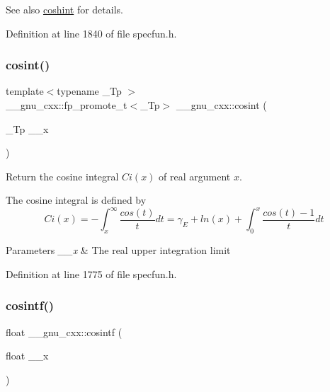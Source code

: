 \begin{DoxySeeAlso}{See also}
\hyperlink{group__gnu__math__spec__func_ga2411d513d418180285ace6650c7b7e31}{coshint} for details. 
\end{DoxySeeAlso}


Definition at line 1840 of file specfun.\+h.

\mbox{\label{group__gnu__math__spec__func_gafd398869cde057087e6b3428a1d13a93}} 
\subsubsection{\texorpdfstring{cosint()}{cosint()}}
{\footnotesize\ttfamily template$<$typename \+\_\+\+Tp $>$ \\
\+\_\+\+\_\+gnu\+\_\+cxx\+::fp\+\_\+promote\+\_\+t$<$\+\_\+\+Tp$>$ \+\_\+\+\_\+gnu\+\_\+cxx\+::cosint (\begin{DoxyParamCaption}\item[{\+\_\+\+Tp}]{\+\_\+\+\_\+x }\end{DoxyParamCaption})\hspace{0.3cm}{\ttfamily [inline]}}

Return the cosine integral $ Ci(x) $ of real argument $ x $.

The cosine integral is defined by \[ Ci(x) = -\int_x^\infty \frac{cos(t)}{t}dt = \gamma_E + ln(x) + \int_0^x \frac{cos(t)-1}{t}dt \]


\begin{DoxyParams}{Parameters}
{\em \+\_\+\+\_\+x} & The real upper integration limit \\
\hline
\end{DoxyParams}


Definition at line 1775 of file specfun.\+h.

\mbox{\label{group__gnu__math__spec__func_ga87202351dc97d2c69e42bf58f911fb5a}} 
\subsubsection{\texorpdfstring{cosintf()}{cosintf()}}
{\footnotesize\ttfamily float \+\_\+\+\_\+gnu\+\_\+cxx\+::cosintf (\begin{DoxyParamCaption}\item[{float}]{\+\_\+\+\_\+x }\end{DoxyParamCaption})\hspace{0.3cm}{\ttfamily [inline]}}

